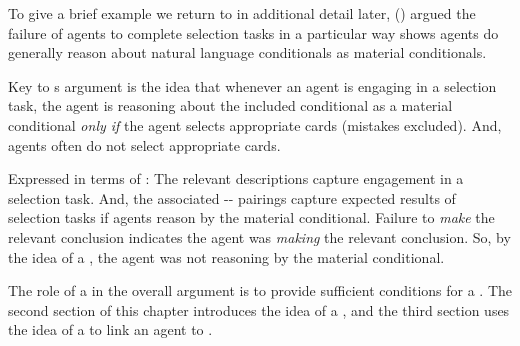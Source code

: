 \begin{note}
  To give a brief example we return to in additional detail later, \citeauthor{Wason:1966aa} (\citeyear{Wason:1966aa}) argued the failure of agents to complete selection tasks in a particular way shows agents do generally reason about natural language conditionals as material conditionals.

  Key to \citeauthor{Wason:1966aa}s argument is the idea that whenever an agent is engaging in a selection task, the agent is reasoning about the included conditional as a material conditional \emph{only if} the agent selects appropriate cards (mistakes excluded).
  And, agents often do not select appropriate cards.

  Expressed in terms of :
  The relevant descriptions capture engagement in a selection task.
  And, the associated -- pairings capture expected results of selection tasks if agents reason by the material conditional.
  Failure to \emph{make} the relevant conclusion indicates the agent was \emph{making} the relevant conclusion.
  So, by the idea of a \tpro{}, the agent was not reasoning by the material conditional.
\end{note}


\begin{note}
  The role of a  in the overall argument is to provide sufficient conditions for a \requ{}.
  The second section of this chapter introduces the idea of a , and the third section uses the idea of a  to link an agent \tCN{} to .
\end{note}


\section{}
\label{cha:typical:int}



\subsection{}
\label{cha:typical:tCDef:ToRdef}


